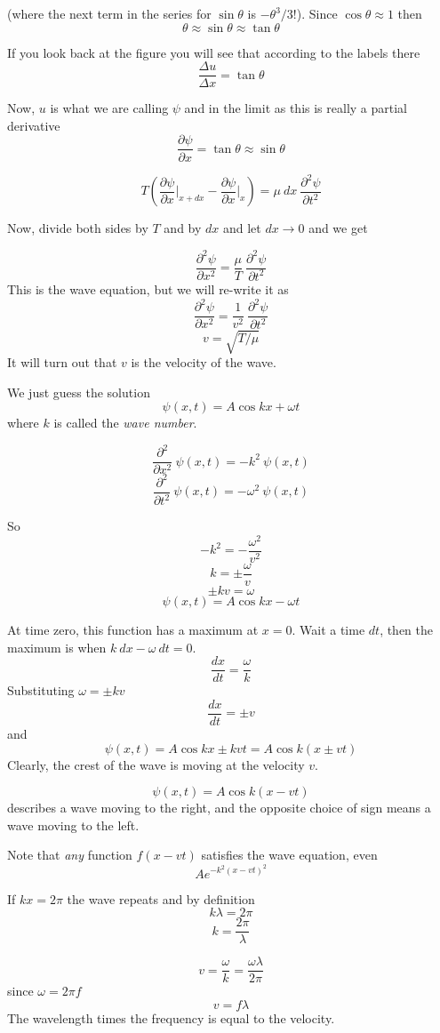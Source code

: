 \documentclass[11pt, oneside]{article}   	%
\begin{document}
(where the next term in the series for $\sin \theta$ is $-\theta^3/3!$).  Since $\cos \theta \approx 1$ then
\[ \theta \approx \sin \theta \approx \tan \theta \]

If you look back at the figure you will see that according to the labels there
\[ \frac{\Delta u}{\Delta x} = \tan \theta \]

Now, $u$ is what we are calling $\psi$ and in the limit as  this is really a partial derivative
\[ \frac{\partial \psi}{\partial x} = \tan \theta \approx \sin \theta \]

\[ T ( \frac{\partial \psi}{\partial x} \bigg |_{x + dx} - \frac{\partial \psi}{\partial x} \bigg |_{x})  =  \mu \ dx \ \frac{\partial^2 \psi}{\partial t^2} \]

Now, divide both sides by $T$ and by $dx$ and let $dx \rightarrow 0$ and we get

\[ \frac{\partial^2 \psi}{\partial x^2} =  \frac{\mu}{T}  \ \frac{\partial^2 \psi}{\partial t^2} \]
This is the wave equation, but we will re-write it as
\[ \frac{\partial^2 \psi}{\partial x^2} =  \frac{1}{v^2}  \ \frac{\partial^2 \psi}{\partial t^2} \]
\[ v = \sqrt{T/\mu} \]
It will turn out that $v$ is the velocity of the wave.

We just guess the solution
\[ \psi(x,t) = A \cos kx + \omega t \]
where $k$ is called the \emph{wave number}.

\[ \frac{\partial^2}{\partial x^2} \ \psi(x,t) = -k^2  \ \psi(x,t) \]
\[ \frac{\partial^2}{\partial t^2} \ \psi(x,t) = -\omega^2  \ \psi(x,t) \]

So 
\[ -k^2 = -\frac{ \omega^2}{v^2} \]
\[ k = \pm \frac{\omega}{v} \]
\[ \pm kv = \omega \]
\[ \psi(x,t) = A \cos kx - \omega t \]

At time zero, this function has a maximum at $x=0$.  Wait a time $dt$, then the maximum is when $k\ dx-\omega\ dt = 0$.
\[ \frac{dx}{dt} = \frac{\omega}{k} \]
Substituting $\omega = \pm kv$
\[ \frac{dx}{dt} = \pm v \]
and
\[ \psi(x,t) = A \cos kx \pm kvt = A \cos k(x \pm vt) \]
Clearly, the crest of the wave is moving at the velocity $v$.

\[ \psi(x,t) = A \cos k(x - vt) \]
describes a wave moving to the right, and the opposite choice of sign means a wave moving to the left.

Note that \emph{any} function $f(x - vt)$ satisfies the wave equation, even
\[ A e^{-k^2(x-vt)^2} \]

If $kx = 2 \pi$ the wave repeats and by definition
\[ k \lambda = 2 \pi \]
\[ k = \frac{2 \pi}{\lambda} \]

\[ v = \frac{\omega}{k} = \frac{\omega \lambda}{2 \pi} \]
since $\omega = 2 \pi f$
\[ v = f \lambda \]
The wavelength times the frequency is equal to the velocity.
\end{document}
